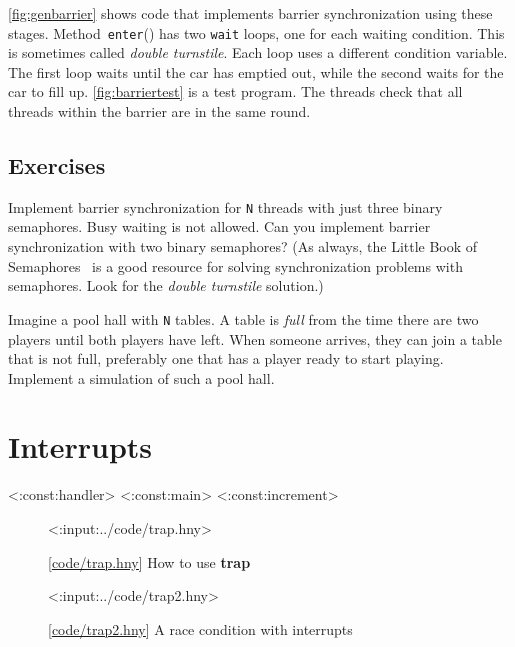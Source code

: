 \documentclass{report}
\newcommand{\harmonylink}[1]{%
[\href{https://harmony.cs.cornell.edu/#1}{\underline{#1}}]%
}
\newenvironment{code}{
\tcolorbox
}{
\endtcolorbox
}
\begin{document}
{\autoref{fig:genbarrier} shows code that implements barrier synchronization
using these stages.
Method~\texttt{enter}() has two \texttt{wait} loops, one for each
waiting condition.
This is sometimes called \emph{double turnstile}.
Each loop uses a different condition variable.
The first loop waits until the car has emptied out, while
the second waits for the car to fill up.
\autoref{fig:barriertest} is a test program.  The threads check
that all threads within the barrier are in the same round.

\section*{Exercises}
\begin{problems}
\item Implement barrier synchronization for \texttt{N} threads
with just three binary semaphores.  Busy waiting is not allowed.
Can you implement barrier synchronization with two binary semaphores?
(As always, the Little Book of Semaphores~\cite{Downey09} is a good resource
for solving synchronization problems with semaphores.
Look for the \emph{double turnstile}
%
solution.)
\item Imagine a pool hall with \texttt{N} tables.  A table is \emph{full}
from the time there are two players until both players have left.
When someone arrives, they can join a table that is not full, preferably
one that has a player ready to start playing.
Implement a simulation of such a pool hall.
\end{problems}

\chapter{Interrupts}
\label{ch:interrupts}

<{:const:handler}>
<{:const:main}>
<{:const:increment}>

\begin{figure}
\begin{code}
<{:input:../code/trap.hny}>
\end{code}
\caption{\harmonylink{code/trap.hny} How to use \textbf{trap}}
\label{fig:trap}
\end{figure}

\begin{figure}
\begin{code}
<{:input:../code/trap2.hny}>
\end{code}
\caption{\harmonylink{code/trap2.hny} A race condition with interrupts}
\label{fig:trap2}
\end{figure}

}
\end{document}
